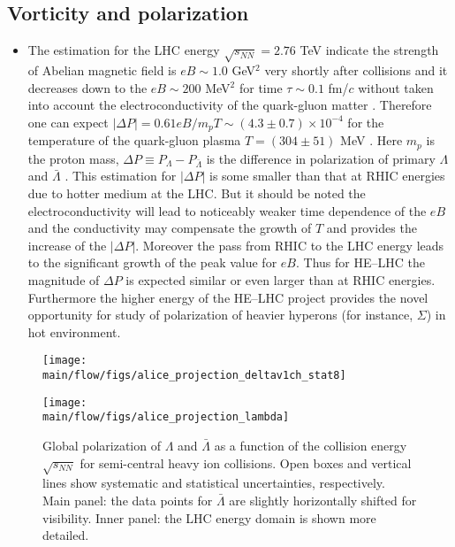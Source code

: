 \subsection{Vorticity and polarization}

\begin{itemize}
	\item
The estimation for the LHC energy $\sqrt{s_{NN}}=2.76$ TeV indicate the strength of Abelian magnetic field is $eB \sim 1.0$ GeV$^{2}$ very shortly after collisions and it decreases down to the $eB \sim 200$ MeV$^{2}$ for time $\tau \sim 0.1$ fm/$c$ without taken into account the electroconductivity of the quark-gluon matter \cite{AHEP-2014-193039-2014,JPCS-668-012129-2016,JPCS-675-022021-2016}. Therefore one can expect $|\Delta P|=0.61eB/m_{p}T \sim (4.3 \pm 0.7) \times 10^{-4}$ for the temperature of the quark-gluon plasma $T=(304 \pm 51)$ MeV \cite{NPA-904-905-573c-2013}. Here $m_{p}$ is the proton mass, $\Delta P \equiv P_{\Lambda}-P_{\bar{\Lambda}}$ is the difference in polarization of primary $\Lambda$ and $\bar{\Lambda}$ \cite{PRC-95-054902-2017}. This estimation for $|\Delta P|$ is some smaller than that at RHIC energies due to hotter medium at the LHC. But it should be noted the electroconductivity will lead to noticeably weaker time dependence of the $eB$ \cite{AHEP-2013-490495-2013} and the conductivity may compensate the growth of $T$ and provides the increase of the $|\Delta P|$. Moreover the pass from RHIC to the LHC energy leads to the significant growth of the peak value for $eB$. Thus for HE--LHC the magnitude of $\Delta P$ is expected similar or even larger than at RHIC energies. Furthermore the higher energy of the HE--LHC project provides the novel opportunity for study of polarization of heavier hyperons (for instance, $\Sigma$) in hot environment.
\end{itemize}

\begin{figure}[!htb]
\begin{center}
\texttt{[image: \\main/flow/figs/alice\_projection\_deltav1ch\_stat8]}
\caption{
}
\label{fig:alice_delta_v1}
\end{center}
\end{figure}


\begin{figure*}[!htb]
\begin{center}
\texttt{[image: \\main/flow/figs/alice\_projection\_lambda]}
\caption{Global polarization of $\Lambda$ and $\bar{\Lambda}$ as a function of the collision energy $\sqrt{s_{NN}}$ for semi-central heavy ion collisions. Open boxes
and vertical lines show systematic and statistical uncertainties,
respectively. Main panel: the data points for $\bar{\Lambda}$ are slightly horizontally shifted for visibility. Inner panel: the LHC energy domain is shown more detailed.
}
\label{fig:alice_lambda}
\end{center}
\end{figure*}

